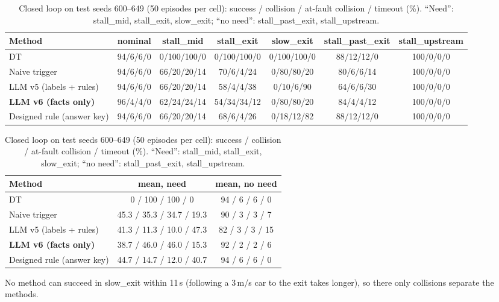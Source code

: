 \documentclass[11pt]{article}
\newenvironment{revblock}{\color{red}}{}
\begin{document}
\begin{revblock}
\begin{table}[h]
\centering\footnotesize
\caption{Closed loop on test seeds 600--649 (50 episodes per cell): success / collision / at-fault collision / timeout (\%).
``Need'': stall\_mid, stall\_exit, slow\_exit; ``no need'': stall\_past\_exit, stall\_upstream.}
\label{tab:closed}
\setlength{\tabcolsep}{3pt}
\begin{tabular}{lcccccc}
\toprule
Method & nominal & stall\_mid & stall\_exit & slow\_exit & stall\_past\_exit & stall\_upstream \\
\midrule
DT & 94/6/6/0 & 0/100/100/0 & 0/100/100/0 & 0/100/100/0 & 88/12/12/0 & 100/0/0/0 \\
Naive trigger & 94/6/6/0 & 66/20/20/14 & 70/6/4/24 & 0/80/80/20 & 80/6/6/14 & 100/0/0/0 \\
LLM v5 (labels + rules) & 94/6/6/0 & 66/20/20/14 & 58/4/4/38 & 0/10/6/90 & 64/6/6/30 & 100/0/0/0 \\
\textbf{LLM v6 (facts only)} & 96/4/4/0 & 62/24/24/14 & 54/34/34/12 & 0/80/80/20 & 84/4/4/12 & 100/0/0/0 \\
Designed rule (answer key) & 94/6/6/0 & 66/20/20/14 & 68/6/4/26 & 0/18/12/82 & 88/12/12/0 & 100/0/0/0 \\
\bottomrule
\end{tabular}

\vspace{4pt}
\begin{tabular}{lcc}
\toprule
Method & mean, need & mean, no need \\
\midrule
DT & 0 / 100 / 100 / 0 & 94 / 6 / 6 / 0 \\
Naive trigger & 45.3 / 35.3 / 34.7 / 19.3 & 90 / 3 / 3 / 7 \\
LLM v5 (labels + rules) & 41.3 / 11.3 / 10.0 / 47.3 & 82 / 3 / 3 / 15 \\
\textbf{LLM v6 (facts only)} & 38.7 / 46.0 / 46.0 / 15.3 & 92 / 2 / 2 / 6 \\
Designed rule (answer key) & 44.7 / 14.7 / 12.0 / 40.7 & 94 / 6 / 6 / 0 \\
\bottomrule
\end{tabular}
\end{table}

No method can succeed in slow\_exit within 11\,s (following a 3\,m/s car to the exit takes longer), so there only
collisions separate the methods.


\end{revblock}
\end{document}
